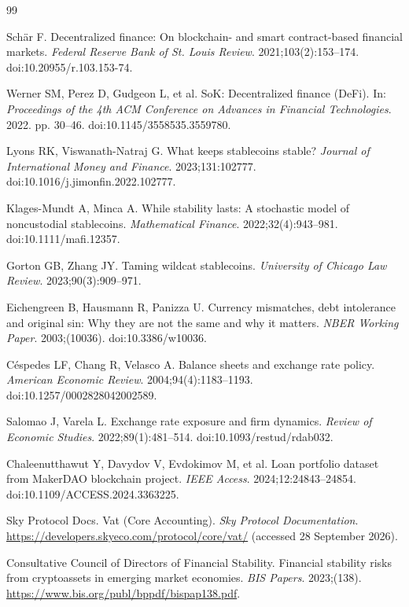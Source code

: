 \begin{thebibliography}{99}
\setlength{\itemsep}{0pt}
\setlength{\parsep}{0pt}

Sch\"ar F.
Decentralized finance: On blockchain- and smart contract-based financial markets.
\textit{Federal Reserve Bank of St. Louis Review}. 2021;103(2):153--174.
doi:10.20955/r.103.153-74.

Werner SM, Perez D, Gudgeon L, et al.
SoK: Decentralized finance (DeFi).
In: \textit{Proceedings of the 4th ACM Conference on Advances in Financial Technologies}. 2022. pp. 30--46.
doi:10.1145/3558535.3559780.

Lyons RK, Viswanath-Natraj G.
What keeps stablecoins stable?
\textit{Journal of International Money and Finance}. 2023;131:102777.
doi:10.1016/j.jimonfin.2022.102777.

Klages-Mundt A, Minca A.
While stability lasts: A stochastic model of noncustodial stablecoins.
\textit{Mathematical Finance}. 2022;32(4):943--981.
doi:10.1111/mafi.12357.

Gorton GB, Zhang JY.
Taming wildcat stablecoins.
\textit{University of Chicago Law Review}. 2023;90(3):909--971.

Eichengreen B, Hausmann R, Panizza U.
Currency mismatches, debt intolerance and original sin: Why they are not the same and why it matters.
\textit{NBER Working Paper}. 2003;(10036). doi:10.3386/w10036.

C\'espedes LF, Chang R, Velasco A.
Balance sheets and exchange rate policy.
\textit{American Economic Review}. 2004;94(4):1183--1193.
doi:10.1257/0002828042002589.

Salomao J, Varela L.
Exchange rate exposure and firm dynamics.
\textit{Review of Economic Studies}. 2022;89(1):481--514.
doi:10.1093/restud/rdab032.

Chaleenutthawut Y, Davydov V, Evdokimov M, et al.
Loan portfolio dataset from MakerDAO blockchain project.
\textit{IEEE Access}. 2024;12:24843--24854.
doi:10.1109/ACCESS.2024.3363225.

Sky Protocol Docs.
Vat (Core Accounting).
\textit{Sky Protocol Documentation}. \url{https://developers.skyeco.com/protocol/core/vat/} (accessed 28 September 2026).

Consultative Council of Directors of Financial Stability.
Financial stability risks from cryptoassets in emerging market economies.
\textit{BIS Papers}. 2023;(138). \url{https://www.bis.org/publ/bppdf/bispap138.pdf}.


\end{thebibliography}

